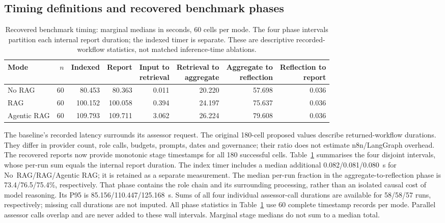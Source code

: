 \documentclass[journal]{IEEEtran}
\newif\ifshowrevisions
\newenvironment{revision}{\begingroup\ifshowrevisions\color{blue}\else\color{black}\fi}{\endgroup}
\begin{document}
\begin{revision}
\subsection{Timing definitions and recovered benchmark phases}
\begin{table}[!t]
\centering\ifshowrevisions\color{blue}\else\color{black}\fi\footnotesize
\caption{Recovered benchmark timing: marginal medians in seconds, 60 cells
per mode. The four phase intervals partition each internal report duration;
the indexed timer is separate. These are descriptive recorded-workflow
statistics, not matched inference-time ablations.}
\label{tab:recovered-timing}
\begin{tabular}{lrrrrrrr}
\toprule
Mode & $n$ & Indexed & Report & \shortstack{Input to\\retrieval} &
\shortstack{Retrieval to\\aggregate} & \shortstack{Aggregate to\\reflection} &
\shortstack{Reflection to\\report} \\
\midrule
No RAG & 60 & 80.453 & 80.363 & 0.011 & 20.220 & 57.698 & 0.036 \\
RAG & 60 & 100.152 & 100.058 & 0.394 & 24.197 & 75.637 & 0.036 \\
Agentic RAG & 60 & 109.793 & 109.711 & 3.062 & 26.224 & 79.608 & 0.036 \\
\bottomrule
\end{tabular}
\end{table}

The baseline's recorded latency surrounds its assessor request. The original
180-cell proposed values describe returned-workflow durations. They differ in
provider count, role calls, budgets, prompts, dates and governance; their ratio
does not estimate n8n/LangGraph overhead. The recovered reports now provide
monotonic stage timestamps for all 180 successful cells.
Table~\ref{tab:recovered-timing} summarises the four disjoint intervals,
whose per-run sum equals the internal report duration. The index timer
includes a median additional 0.082/0.081/0.080~s for No~RAG/RAG/Agentic RAG;
it is retained as a separate measurement. The median per-run fraction in the
aggregate-to-reflection phase is 73.4/76.5/75.4\%, respectively. That phase
contains the role chain and its surrounding processing, rather than an
isolated causal cost of model reasoning. Its P95 is 85.156/110.447/125.168~s.
Sums of all four individual assessor-call durations are available for
58/58/57 runs, respectively; missing call durations are not imputed. All
phase statistics in Table~\ref{tab:recovered-timing} use 60 complete timestamp
records per mode. Parallel assessor calls overlap and are never added to
these wall intervals. Marginal stage medians do not sum to a median total.


\end{revision}
\end{document}
